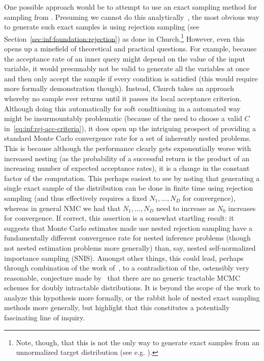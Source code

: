 One possible approach would be to attempt to
use an exact sampling method for sampling from \conditional. Presuming we cannot
do this analytically~\citep{cornish2017efficient}, the most obvious way to generate such exact
samples is using rejection sampling (see Section~\ref{sec:inf:foundation:rejection}) as done in
Church.\footnote{Note, though, that this
is not the only way to generate exact samples from an unnormalized target distribution (see e.g. \citep{craiu2011perfection}).}
However, even this opens up a minefield of theoretical
and practical questions.  For example, because the acceptance rate of an inner query might depend on the
value of the input variable, it would presumably not be valid to generate all the variables at once
and then only accept the sample if every condition is satisfied (this would require more formally demonstration though).
Instead, Church takes an approach whereby no sample ever returns until it passes its local acceptance criterion.
Although doing this automatically for soft conditioning in a automated way might be insurmountably problematic (because of the
need to choose a valid $C$ in~\eqref{eq:inf:rej-acc-criteria}), it does open up the intriguing prospect
of providing a standard Monte Carlo convergence rate for a set of inherently nested problems.  This is because although the performance clearly
gets exponentially worse with increased nesting (as the probability of a successful return is the
product of an increasing number of expected acceptance rates), it is a change in the constant factor of the
computation.  This perhaps easiest to see by noting that 
generating a single exact sample of the distribution
can be done in finite time using rejection sampling (and thus effectively requires a fixed $N_1,\dots,N_D$ for
convergence), whereas in general NMC we had that $N_1,\dots,N_D$ need to increase as $N_0$ increases for convergence.
If correct, this assertion is a somewhat startling result: it suggests that Monte Carlo estimates made use 
nested rejection sampling have a fundamentally different
convergence rate for nested inference problems (though not nested estimation problems more generally) than, say,
nested self-normalized importance sampling (SNIS).  Amongst other things, this could lead, perhaps through combination of 
the work of~\cite{moller2006efficient}, to a contradiction of the, ostensibly very reasonable, conjecture
made by~\cite{murray2004bayesian} that there are no generic tractable MCMC schemes for doubly intractable distributions.
It is beyond the scope of the work to analyze this hypothesis more formally, or the rabbit hole of
nested exact sampling methods more generally, but highlight that this constitutes a potentially fascinating line of inquiry.

